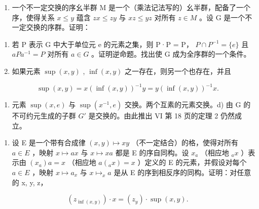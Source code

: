 \BourbakiExercises

\BourbakiExerciseGroup

\begin{enumerate}
\def\labelenumi{\arabic{enumi})}
\tightlist
\item
  一个不一定交换的序幺半群 M 是一个（乘法记法写的）幺半群，配备了一个序，使得关系 \(x \leqslant y\) 蕴含 \(zx \leqslant zy\) 与 \(xz \leqslant yz\) 对所有 \(z \in M\) 。设 G 是一个不一定交换的序群。证明：
\end{enumerate}

\begin{enumerate}
\def\labelenumi{\alph{enumi})}
\item
  若 P 表示 G 中大于单位元 e 的元素之集，则 P·P = P， \(P \cap P^{-1} = \{e\}\) 且 \(aPa^{-1} = P\) 对所有 \(a \in G\) 。证明逆命题。找出使 G 成为全序群的一个条件。
\item
  如果元素 \(\sup (x,y)\) , \(\inf (x,y)\) 之一存在，则另一个也存在，并且
\end{enumerate}

\[
\sup (x, y) = x (\inf (x, y)) ^ {- 1} y = y (\inf (x, y)) ^ {- 1} x.
\]

\begin{enumerate}
\def\labelenumi{\alph{enumi})}
\setcounter{enumi}{2}
\tightlist
\item
  元素 \(\sup(x, e)\) 与 \(\sup(x^{-1}, e)\) 交换。两个互素的元素交换。d) 由 G 的不可约元生成的子群 \(G'\) 是交换的。由此推出 VI 第 18 页的定理 2 仍然成立。
\end{enumerate}

\begin{enumerate}
\def\labelenumi{\arabic{enumi})}
\setcounter{enumi}{1}
\tightlist
\item
  设 E 是一个带有合成律 \((x, y) \mapsto xy\) （不一定结合）的格，使得对所有 \(a \in E\) ，映射 \(x \mapsto ax\) 与 \(x \mapsto xa\) 都是 E 的序自同构。设 \(x_{a}\) （相应地 \(_{a}x\) ）表示由 \((x_{a})a = x\) （相应地 \(a(_{a}x) = x\) ）定义的 E 的元素，并假设对每个 \(a \in E\) ，映射 \(x \mapsto a_{x}\) 与 \(x \mapsto_{x} a\) 是从 E 的序到相反序的同构。证明：对任意的 x, y, z，
\end{enumerate}

\[
\left(z _ {\inf (x, y)}\right) \cdot x = \left(z _ {y}\right) \cdot \sup (x, y).
\]

